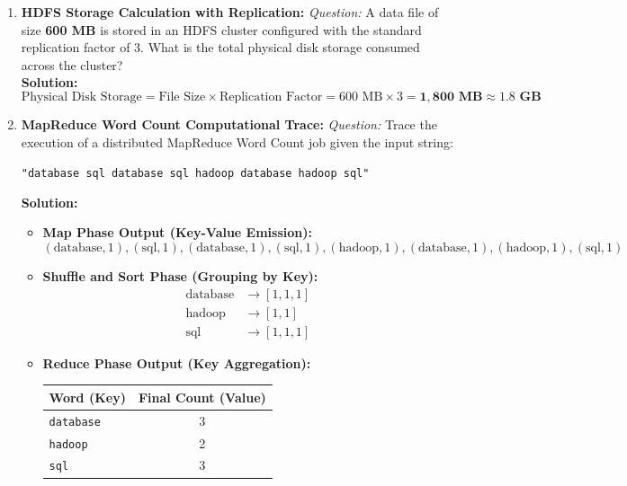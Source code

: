\begin{enumerate}[resume*]
\item \textbf{HDFS Storage Calculation with Replication:}
\textit{Question:} A data file of size \textbf{600 MB} is stored in an HDFS cluster configured with the standard replication factor of 3. What is the total physical disk storage consumed across the cluster? \\
\textbf{Solution:}
\[
\text{Physical Disk Storage} = \text{File Size} \times \text{Replication Factor} = 600\text{ MB} \times 3 = \mathbf{1,800\text{ MB}} \approx \mathbf{1.8\text{ GB}}
\]

\item \textbf{MapReduce Word Count Computational Trace:}
\textit{Question:} Trace the execution of a distributed MapReduce Word Count job given the input string:
\begin{center}
\texttt{"database sql database sql hadoop database hadoop sql"}
\end{center}
\textbf{Solution:}
\begin{itemize}
    \item \textbf{Map Phase Output (Key-Value Emission):}
    \[
    (\text{database}, 1), (\text{sql}, 1), (\text{database}, 1), (\text{sql}, 1), (\text{hadoop}, 1), (\text{database}, 1), (\text{hadoop}, 1), (\text{sql}, 1)
    \]
    \item \textbf{Shuffle and Sort Phase (Grouping by Key):}
    \begin{align*}
    \text{database} &\to [1, 1, 1] \\
    \text{hadoop}   &\to [1, 1] \\
    \text{sql}      &\to [1, 1, 1]
    \end{align*}
    \item \textbf{Reduce Phase Output (Key Aggregation):}
    \begin{center}
    \begin{tabular}{l c}
    \toprule
    \textbf{Word (Key)} & \textbf{Final Count (Value)} \\
    \midrule
    \texttt{database} & 3 \\
    \texttt{hadoop}   & 2 \\
    \texttt{sql}      & 3 \\
    \bottomrule
    \end{tabular}
    \end{center}
\end{itemize}
\end{enumerate}

